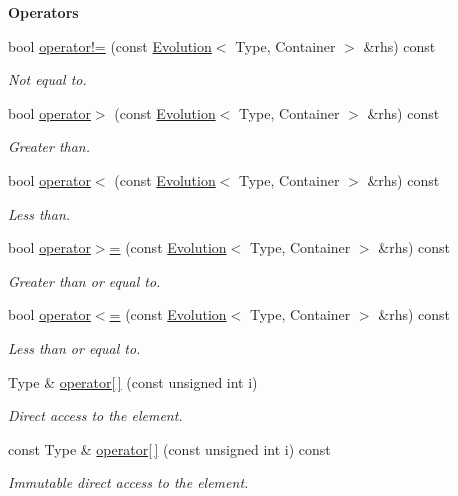 \begin{Indent}{\bf Operators}
\begin{DoxyCompactItemize}
bool \hyperlink{exceptionmagrathea_1_1Evolution_a9dfdce59ff9ece6b9a6e0477d7760ae7}{operator!=} (const \hyperlink{exceptionmagrathea_1_1Evolution}{Evolution}$<$ Type, Container $>$ \&rhs) const 
\begin{DoxyCompactList}\small\item\em Not equal to. \end{DoxyCompactList}\item 
bool \hyperlink{exceptionmagrathea_1_1Evolution_a72bd838254950df5359d7e58a17a8b31}{operator$>$} (const \hyperlink{exceptionmagrathea_1_1Evolution}{Evolution}$<$ Type, Container $>$ \&rhs) const 
\begin{DoxyCompactList}\small\item\em Greater than. \end{DoxyCompactList}\item 
bool \hyperlink{exceptionmagrathea_1_1Evolution_aaf6939f435b36f82e92e837bc83f8820}{operator$<$} (const \hyperlink{exceptionmagrathea_1_1Evolution}{Evolution}$<$ Type, Container $>$ \&rhs) const 
\begin{DoxyCompactList}\small\item\em Less than. \end{DoxyCompactList}\item 
bool \hyperlink{exceptionmagrathea_1_1Evolution_a56ebbdb9f2701da9e84f5cbf441006ac}{operator$>$=} (const \hyperlink{exceptionmagrathea_1_1Evolution}{Evolution}$<$ Type, Container $>$ \&rhs) const 
\begin{DoxyCompactList}\small\item\em Greater than or equal to. \end{DoxyCompactList}\item 
bool \hyperlink{exceptionmagrathea_1_1Evolution_a303325d7733eef22d483c8833b708b20}{operator$<$=} (const \hyperlink{exceptionmagrathea_1_1Evolution}{Evolution}$<$ Type, Container $>$ \&rhs) const 
\begin{DoxyCompactList}\small\item\em Less than or equal to. \end{DoxyCompactList}\item 
Type \& \hyperlink{exceptionmagrathea_1_1Evolution_af01ebd04cd6e83af3155278afcfce975}{operator\mbox{[}$\,$\mbox{]}} (const unsigned int i)
\begin{DoxyCompactList}\small\item\em Direct access to the element. \end{DoxyCompactList}\item 
const Type \& \hyperlink{exceptionmagrathea_1_1Evolution_a9a0ca349a592a47f6f6f0ac59d300963}{operator\mbox{[}$\,$\mbox{]}} (const unsigned int i) const 
\begin{DoxyCompactList}\small\item\em Immutable direct access to the element. \end{DoxyCompactList}\end{DoxyCompactItemize}
\end{Indent}
